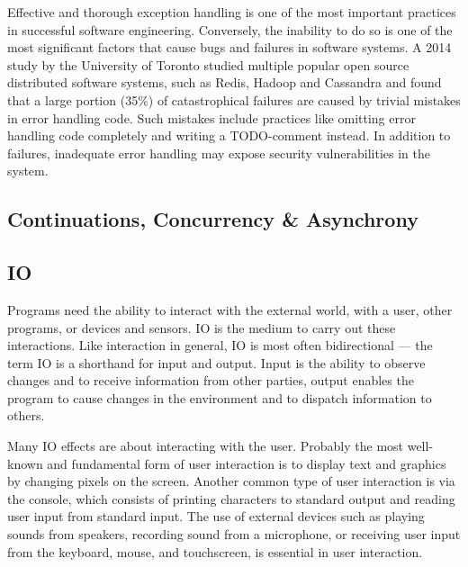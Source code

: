 Effective and thorough exception handling is one of the most important practices in successful software engineering. Conversely, the inability to do so is one of the most significant factors that cause bugs and failures in software systems. A 2014 study by the University of Toronto studied multiple popular open source distributed software systems, such as Redis, Hadoop and Cassandra and found that a large portion (35\%) of catastrophical failures are caused by trivial mistakes in error handling code. Such mistakes include practices like omitting error handling code completely and writing a TODO-comment instead. In addition to failures, inadequate error handling may expose security vulnerabilities in the system.~\cite{simple-testing-failures}


\subsection{Continuations, Concurrency \& Asynchrony}


\subsection{IO}
Programs need the ability to interact with the external world, with a user, other programs, or devices and sensors. IO is the medium to carry out these interactions. Like interaction in general, IO is most often bidirectional --- the term IO is a shorthand for input and output. Input is the ability to observe changes and to receive information from other parties, output enables the program to cause changes in the environment and to dispatch information to others.

Many IO effects are about interacting with the user. Probably the most well-known and fundamental form of user interaction is to display text and graphics by changing pixels on the screen. Another common type of user interaction is via the console, which consists of printing characters to standard output and reading user input from standard input. The use of external devices such as playing sounds from speakers, recording sound from a microphone, or receiving user input from the keyboard, mouse, and touchscreen, is essential in user interaction.

